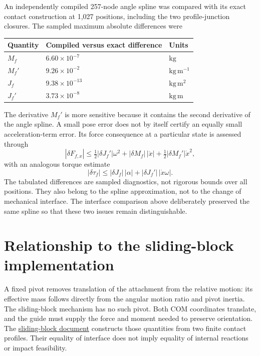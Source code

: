 \documentclass[11pt,letterpaper]{article}
\numberwithin{equation}{section}
\newcommand{\half}{\tfrac12}
\begin{document}
An independently compiled 257-node angle spline was compared with its exact contact construction at 1,027 positions, including the two profile-junction closures. The sampled maximum absolute differences were
\begin{center}
\begin{tabular}{@{}lll@{}}
\toprule
Quantity & Compiled versus exact difference & Units\\
\midrule
$M_f$ & $6.60\times10^{-7}$ & $\mathrm{kg}$\\
$M_f'$ & $9.26\times10^{-2}$ & $\mathrm{kg\,m^{-1}}$\\
$J_f$ & $9.38\times10^{-13}$ & $\mathrm{kg\,m^2}$\\
$J_f'$ & $3.73\times10^{-8}$ & $\mathrm{kg\,m}$\\
\bottomrule
\end{tabular}
\end{center}
The derivative $M_f'$ is more sensitive because it contains the second derivative of the angle spline. A small pose error does not by itself certify an equally small acceleration-term error. Its force consequence at a particular state is assessed through
\begin{equation}
  |\delta F_{f,x}|\le\half|\delta J_f'|\omega^2
            +|\delta M_f|\,|\ddot x|
            +\half|\delta M_f'|\dot x^2,
  \label{eq:error-force}
\end{equation}
with an analogous torque estimate
\begin{equation}
  |\delta\tau_f|\le |\delta J_f|\,|\alpha|
                            +|\delta J_f'|\,|\dot x\omega|.
\end{equation}
The tabulated differences are sampled diagnostics, not rigorous bounds over all positions. They also belong to the spline approximation, not to the change of mechanical interface. The interface comparison above deliberately preserved the same spline so that these two issues remain distinguishable.

\section{Relationship to the sliding-block implementation}
\label{sec:next}

A fixed pivot removes translation of the attachment from the relative motion:
its effective mass follows directly from the angular motion ratio and pivot
inertia. The sliding-block mechanism has no such pivot. Both COM coordinates
translate, and the guide must supply the force and moment needed to preserve
orientation. The \href{../sliding_block/formulation.pdf}{sliding-block document}
constructs those quantities from two finite contact profiles. Their equality of
interface does not imply equality of internal reactions or impact feasibility.
\end{document}
